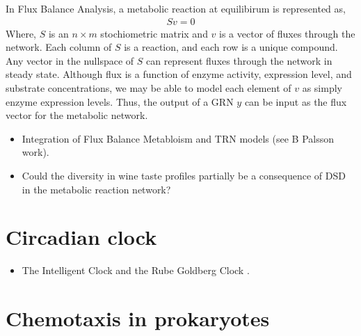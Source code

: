 \documentclass[11 pt]{article}
\begin{document}
    In Flux Balance Analysis, a metabolic reaction at equilibirum is represented as, 
    \begin{align*}
      Sv = 0
    \end{align*}
    Where, $S$ is an $n \times m$ stochiometric matrix and $v$ is a vector of fluxes through the network. Each column of $S$ is a reaction, and each row is a unique compound. Any vector in the nullspace of $S$ can represent fluxes through the network in steady state. Although flux is a function of enzyme activity, expression level, and substrate concentrations, we may be able to model each element of $v$ as simply enzyme expression levels. Thus, the output of a GRN $y$ can be input as the flux vector for the metabolic network. 
      \begin{itemize}
        \item Integration of Flux Balance Metabloism and TRN models (see B Palsson work).
        \item Could the diversity in wine taste profiles partially be a consequence of DSD in the metabolic reaction network? 
      \end{itemize}
    \section{Circadian clock}
      \begin{itemize}
        \item The Intelligent Clock and the Rube Goldberg Clock \citep{sancar2008intelligent}.
      \end{itemize}
    \section{Chemotaxis in prokaryotes}



\end{document}
